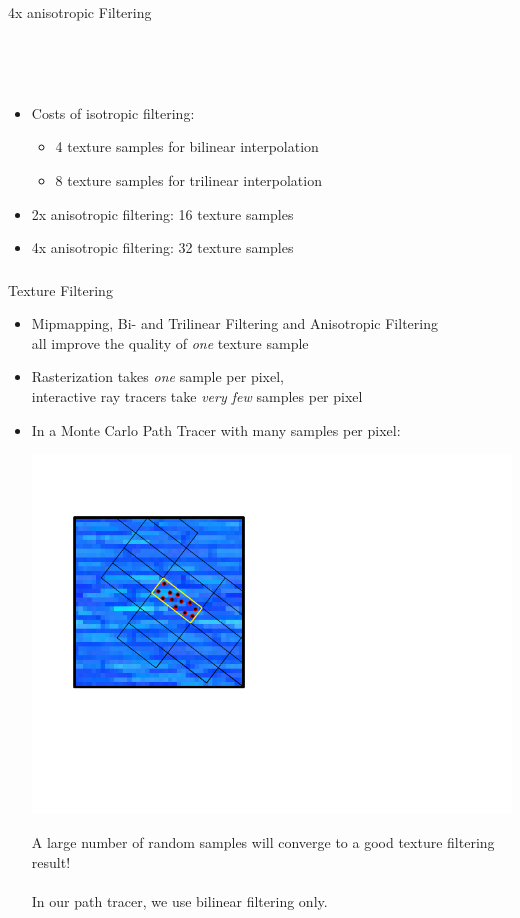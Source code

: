 \documentclass[utf8,stillsansserifmath,fleqn,t]{beamer}
\begin{document}
\begin{frame}
\begin{columns}
\centerline{4x anisotropic Filtering}
\end{columns}
~\\~
\begin{itemize}
\item Costs of isotropic filtering:
    \begin{itemize}
    \item 4 texture samples for bilinear interpolation
    \item 8 texture samples for trilinear interpolation
    \end{itemize}
\item 2x anisotropic filtering: 16 texture samples
\item 4x anisotropic filtering: 32 texture samples
\end{itemize}
\end{frame}

\begin{frame}[label=texture-filtering-summary]
\frametitle{\insertsection}
Texture Filtering
\begin{itemize}
\item Mipmapping, Bi- and Trilinear Filtering and Anisotropic Filtering\\
all improve the quality of \emph{one} texture sample
\item Rasterization takes \emph{one} sample per pixel,\\
interactive ray tracers take \emph{very few} samples per pixel
\item In a Monte Carlo Path Tracer with many samples per pixel:\\
\begin{minipage}{.4\textwidth}
\includegraphics[width=\textwidth]{./fig/monte-carlo-texture-sampling.pdf}
\end{minipage}\hfill
\begin{minipage}{.5\textwidth}
\raggedright
A large number of random samples will converge to a good texture filtering
result!\\~\\
In our path tracer, we use bilinear filtering only.
\end{minipage}
\end{itemize}
\end{frame}
\end{document}
